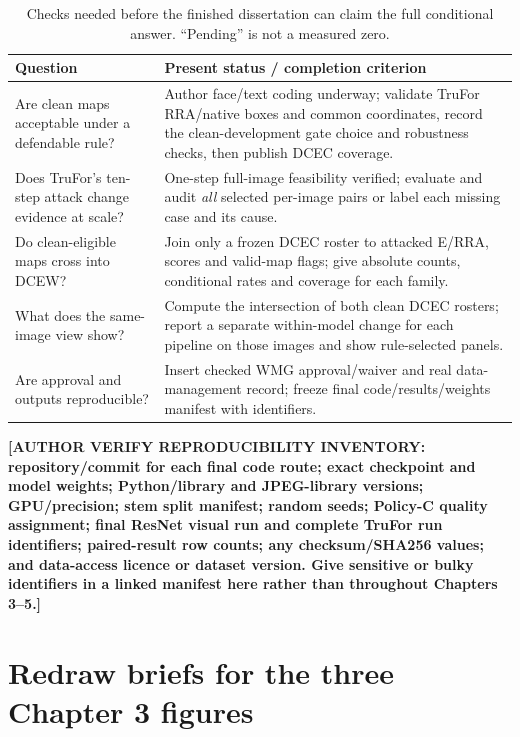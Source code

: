 \begin{table}[htbp]
\centering\small
\caption{Checks needed before the finished dissertation can claim the full conditional answer. ``Pending'' is not a measured zero.}
\label{tab:app-method-open}
\begin{tabularx}{\textwidth}{@{}>{\raggedright\arraybackslash}p{}X@{}}
\toprule
Question & Present status / completion criterion \\
\midrule
Are clean maps acceptable under a defendable rule? & Author face/text coding underway; validate TruFor RRA/native boxes and common coordinates, record the clean-development gate choice and robustness checks, then publish DCEC coverage. \\
Does TruFor's ten-step attack change evidence at scale? & One-step full-image feasibility verified; evaluate and audit \emph{all} selected per-image pairs or label each missing case and its cause. \\
Do clean-eligible maps cross into DCEW? & Join only a frozen DCEC roster to attacked E/RRA, scores and valid-map flags; give absolute counts, conditional rates and coverage for each family. \\
What does the same-image view show? & Compute the intersection of both clean DCEC rosters; report a separate within-model change for each pipeline on those images and show rule-selected panels. \\
Are approval and outputs reproducible? & Insert checked WMG approval/waiver and real data-management record; freeze final code/results/weights manifest with identifiers. \\
\bottomrule
\end{tabularx}
\end{table}

\begin{sloppypar}\noindent\textbf{[AUTHOR VERIFY REPRODUCIBILITY INVENTORY: repository/commit for each final code route; exact checkpoint and model weights; Python/library and JPEG-library versions; GPU/precision; stem split manifest; random seeds; Policy-C quality assignment; final ResNet visual run and complete TruFor run identifiers; paired-result row counts; any checksum/SHA256 values; and data-access licence or dataset version. Give sensitive or bulky identifiers in a linked manifest here rather than throughout Chapters 3--5.]}\end{sloppypar}

\section{Redraw briefs for the three Chapter 3 figures}
\label{app:method-figures}

